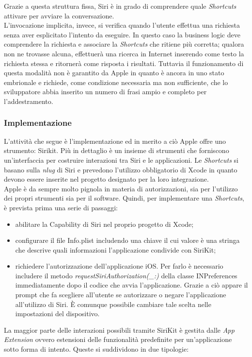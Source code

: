 		Grazie a questa struttura fissa, Siri è in grado di comprendere quale \emph{Shortcuts} attivare per avviare la conversazione. \\
		L'invocazione implicita, invece, si verifica quando l'utente effettua una richiesta senza aver esplicitato l'intento da eseguire. In questo caso la business logic deve comprendere la richiesta e associare la \emph{Shortcuts} che ritiene più corretta; qualora non ne trovasse alcuna, effettuerà una ricerca in Internet inserendo come testo la richiesta stessa e ritornerà come risposta i risultati. Tuttavia il funzionamento di questa modalità non è garantito da Apple in quanto è ancora in uno stato embrionale e richiede, come condizione necessaria ma non sufficiente, che lo sviluppatore abbia inserito un numero di frasi ampio e completo per l'addestramento.
		\subsubsection{Implementazione}
		L'attività che segue è l'implementazione ed in merito a ciò Apple offre uno strumento: Sirikit. Più in dettaglio è un insieme di strumenti che forniscono un'interfaccia per costruire interazioni tra Siri e le applicazioni. Le \emph{Shortcuts} si basano sulla \emph{\gls{nlug}} di Siri e prevedono l'utilizzo obbligatorio di Xcode in quanto devono essere inserite nel progetto designato per la loro integrazione. \\
		Apple è da sempre molto pignola in materia di autorizzazioni, sia per l'utilizzo dei propri strumenti sia per il software. Quindi, per implementare una \emph{Shortcuts}, è prevista prima una serie di passaggi:
		\begin{itemize}
			\item abilitare la Capability di Siri nel proprio progetto di Xcode;
			\item configurare il file Info.plist includendo una chiave il cui valore è una stringa che descrive quali informazioni l'applicazione condivide con SiriKit;
			\item richiedere l’autorizzazione dell’applicazione iOS. Per farlo è necessario includere il metodo \emph{requestSiriAuthorization(\_:)} della classe INPreferences immediatamente dopo il codice che avvia l’applicazione. Grazie a ciò appare il prompt che fa scegliere all’utente se autorizzare o negare l’applicazione all’utilizzo di Siri. È comunque possibile cambiare tale scelta nelle impostazioni del dispositivo.
		\end{itemize}
		La maggior parte delle interazioni possibili tramite SiriKit è gestita dalle \emph{App Extension} ovvero estensioni delle funzionalità predefinite per un'applicazione sotto forma di intento. Queste si suddividono in due tipologie:
